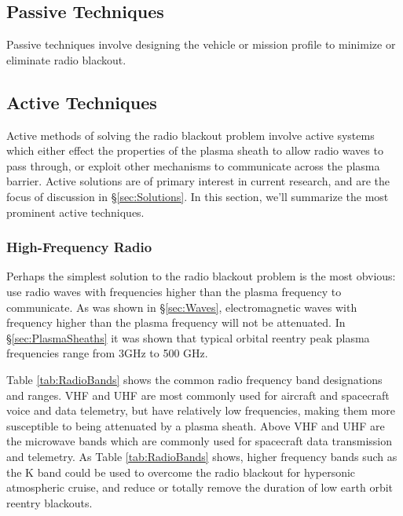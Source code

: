 \documentclass[twocolumn]{article}
\begin{document}
\subsection*{Passive Techniques}
	Passive techniques involve designing the vehicle or mission profile to minimize or eliminate radio blackout.
\subsection*{Active Techniques}
	Active methods of solving the radio blackout problem involve active systems which either effect the properties of the plasma sheath to allow radio waves to pass through, or exploit other mechanisms to communicate across the plasma barrier.
	Active solutions are of primary interest in current research, and are the focus of discussion in \S\ref{sec:Solutions}.
	In this section, we'll summarize the most prominent active techniques.
	
	\subsubsection*{High-Frequency Radio}
	Perhaps the simplest solution to the radio blackout problem is the most obvious: use radio waves with frequencies higher than the plasma frequency to communicate.
	As was shown in \S\ref{sec:Waves}, electromagnetic waves with frequency higher than the plasma frequency will not be attenuated.
	In \S\ref{sec:PlasmaSheaths} it was shown that typical orbital reentry peak plasma frequencies range from 3GHz to 500 GHz.
	
	Table \ref{tab:RadioBands} shows the common radio frequency band designations and ranges.
	VHF and UHF are most commonly used for aircraft and spacecraft voice and data telemetry, but have relatively low frequencies, making them more susceptible to being attenuated by a plasma sheath.
	Above VHF and UHF are the microwave bands which are commonly used for spacecraft data transmission and telemetry.
	As Table \ref{tab:RadioBands} shows, higher frequency bands such as the K band could be used to overcome the radio blackout for hypersonic atmospheric cruise, and reduce or totally remove the duration of low earth orbit reentry blackouts.
	
\end{document}
